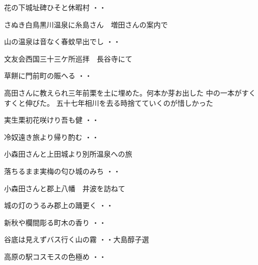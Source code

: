 \begin{shiika}花の下城址碑ひそと休暇村
\hfill{・・}\end{shiika}
\vspace{0.6cm}
さぬき白鳥黒川温泉に糸島さん　増田さんの案内で
\begin{shiika}山の温泉は音なく春蚊早出でし
\hfill{・・}\end{shiika}
\vspace{0.6cm}

文友会西国三十三ケ所巡拝　長谷寺にて
\begin{shiika}草餅に門前町の賑へる
\hfill{・・}\end{shiika}
\vspace{0.6cm}
高田さんに教えられ三年前栗を土に埋めた。何本か芽お出した
中の一本がすくすくと伸びた。
五十七年相川を去る時捨てていくのが惜しかった
\begin{shiika}実生栗初花咲けり吾も健
\hfill{・・}\end{shiika}
\begin{shiika}冷奴遠き旅より帰り酌む
\hfill{・・}\end{shiika}
\vspace{0.6cm}
小森田さんと上田城より別所温泉への旅
\begin{shiika}落ちるまま実梅の匂ひ城のみち
\hfill{・・}\end{shiika}
\vspace{0.6cm}
小森田さんと郡上八幡　井波を訪ねて
\begin{shiika}城の灯のうるみ郡上の踊更く
\hfill{・・}\end{shiika}
\vspace{0.6cm}
\begin{shiika}新秋や欄間彫る町木の香り
\hfill{・・}\end{shiika}
\vspace{0.6cm}
\begin{shiika}谷底は見えずバス行く山の霧
\hfill{・・大島醇子選}\end{shiika}
\vspace{0.6cm}
\begin{shiika}高原の駅コスモスの色極め
\hfill{・・}\end{shiika}
\vspace{0.6cm}
